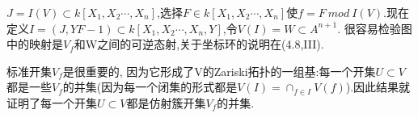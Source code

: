\documentclass[UTF8]{book}
\begin{document}
		$J=I(V)\subset k[X_{1},X_{2}\cdots,X_{n}]$,选择$F\in k[X_{1},X_{2}\cdots,X_{n}]$使$f=F \ mod \ I(V)$.现在定义$I=(J,YF-1)\subset k[X_{1},X_{2}\cdots,X_{n},Y]$,令$V(I)=W\subset A^{n+1}.$
		很容易检验图中的映射是$V_{f}$和W之间的可逆态射,关于坐标环的说明在(4.8,III).

		标准开集$V_{f}$是很重要的, 因为它形成了V的Zariski拓扑的一组基:每一个开集$U\subset V$都是一些$V_{f}$的并集(因为每一个闭集的形式都是$V(I)=\cap_{f \in I} V(f)$).因此结果就证明了每一个开集$U\subset V$都是仿射簇开集$V_{f}$的并集.

		
\end{document}
